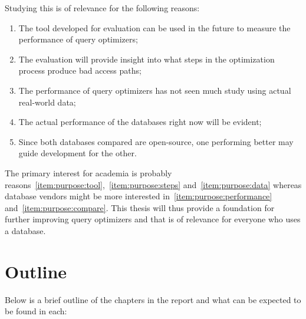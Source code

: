Studying this is of relevance for the following reasons:
\begin{enumerate}
    \item\label{item:purpose:tool} The tool developed for evaluation can be used in the future to measure the performance of query optimizers;
    \item\label{item:purpose:steps} The evaluation will provide insight into what steps in the optimization process produce bad access paths;
    \item\label{item:purpose:data} The performance of query optimizers has not seen much study using actual real-world data;
    \item\label{item:purpose:performance} The actual performance of the databases right now will be evident;
    \item\label{item:purpose:compare} Since both databases compared are open-source, one performing better may guide development for the other.
\end{enumerate}

The primary interest for academia is probably reasons~\ref{item:purpose:tool},~\ref{item:purpose:steps} and~\ref{item:purpose:data} whereas database vendors might be more interested in~\ref{item:purpose:performance} and~\ref{item:purpose:compare}. This thesis will thus provide a foundation for further improving query optimizers and that is of relevance for everyone who uses a database.

\section{Outline}
Below is a brief outline of the chapters in the report and what can be expected to be found in each:


